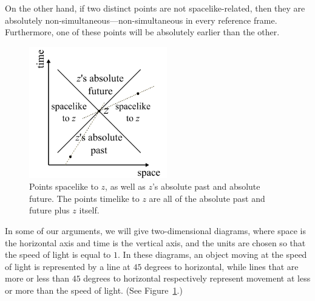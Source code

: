 On the other hand, if two distinct points are not spacelike-related, then they are absolutely non-simultaneous---non-simultaneous 
in every reference frame. Furthermore, one of these points will be absolutely earlier than the other.

\begin{figure}\label{fig:relativity-diagram}
\includegraphics[width=6cm]{relativity-diagram.pdf}
\caption{Points spacelike to $z$, as well as $z$'s absolute past and absolute future. The 
points timelike to $z$ are all of the absolute past and future plus $z$ itself.}
\end{figure}
In some of our arguments, we will give two-dimensional diagrams, where space is the horizontal axis and time
is the vertical axis, and the units are chosen so that the speed of light is equal to $1$. In these diagrams,
an object moving at the speed of light is represented by a line at $45$ degrees to horizontal, while 
lines that are more or less than $45$ degrees to horizontal respectively represent movement at less or more
than the speed of light. (See Figure~\ref{fig:relativity-diagram}.)

